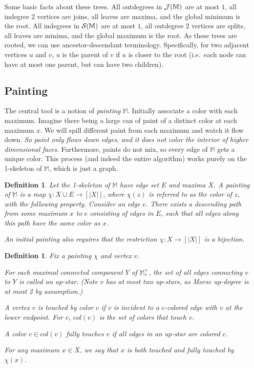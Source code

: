 \documentclass[11pt]{article}
\newtheorem{definition}[theorem]{Definition}
\theoremstyle{definition}
\newcommand{\cJ}{{\cal J}}
\newcommand{\cS}{{\cal S}}
\newcommand{\MM}{\mathbb{M}}
\newcommand{\Sec}[1]{\hyperref[sec:#1]{\S\ref*{sec:#1}}} %
\newcommand{\col}{col}
\begin{document}
Some basic facts about these trees. 
All outdegrees in $\cJ(\MM)$ are at most $1$, all indegree $2$ vertices are joins, all leaves are maxima,
and the global minimum is the root. All indegrees in $\cS(\MM)$ are at most $1$, all outdegree $2$
vertices are splits, all leaves are minima, and the global maximum is the root.
As these trees are rooted, we can use ancestor-descendant terminology.  
Specifically, for two adjacent vertices $u$ and $v$, $u$ is the parent of $v$ if $u$ is closer to the root 
(i.e.\ each node can have at most one parent, but can have two children).  


\subsection{Painting}
The central tool is a notion 
of \emph{painting} $\MM$. Initially associate a color with each maximum. Imagine there being a large
can of paint of a distinct color at each maximum $x$. We will spill different paint from each maximum and watch it flow down.
\emph{So paint only flows down edges, and it does not color the interior of higher dimensional faces.} Furthermore, paints
do not mix, so every edge of $\MM$ gets a unique color. This process (and indeed the entire algorithm)
works purely on the 1-skeleton of $\MM$, which is just a graph.

\begin{definition} \label{def:paint2} Let the 1-skeleton of $\MM$ have edge set $E$ and maxima $X$.
A  \emph{painting} of $\MM$ is a map $\chi:X \cup E \to [|X|]$, where $\chi(z)$ is referred to as the \emph{color} of $z$,
with the following property. 
 Consider an edge $e$. There exists a descending path from some maximum $x$ to $e$
	consisting of edges in $E$, such that all edges along this path have the same color as $x$. 

An \emph{initial} painting also requires that the restriction $\chi:X \to [|X|]$ is a bijection.
\end{definition}

\begin{definition} \label{def:color-set} Fix a painting $\chi$ and vertex $v$.
\begin{asparaitem}
	 \item For each maximal connected component $Y$
     of $\MM^+_v$, the set of all edges connecting $v$ to $Y$
     is called an \emph{up-star}. (Note $v$ has at most two up-stars, as Morse up-degree is at most 2 by assumption.)
	 \item A vertex $v$ is \emph{touched by color $c$} if $v$ is incident to a $c$-colored
	 edge with $v$ at the lower endpoint. For $v$, $\col(v)$ is the set of colors that touch $v$.
	 \item A color $c \in \col(v)$ \emph{fully touches} $v$ if all edges in an up-star are colored $c$.
	 \item For any maximum $x\in X$, we say that $x$ is both touched and fully touched by $\chi(x)$.
\end{asparaitem}
\end{definition}
\end{document}
